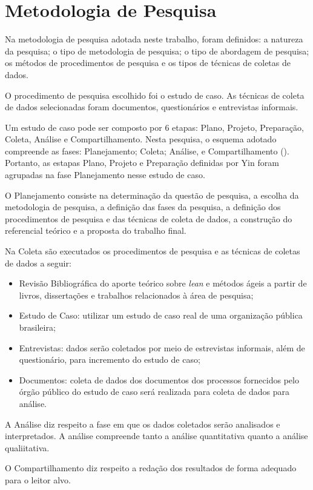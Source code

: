 \section[Metodologia de Pesquisa]{Metodologia de Pesquisa}

Na metodologia de pesquisa adotada neste trabalho, foram definidos: a natureza da pesquisa; o tipo de metodologia de pesquisa; o tipo de abordagem de pesquisa; os métodos de
procedimentos de pesquisa e os tipos de técnicas de coletas de dados.

O procedimento de pesquisa escolhido foi o estudo de caso. As técnicas de coleta de dados selecionadas foram
documentos, questionários e entrevistas informais. 

Um estudo de caso pode ser composto por 6 etapas: Plano, Projeto, Preparação, Coleta, Análise e Compartilhamento. Nesta pesquisa, o esquema adotado compreende as fases: Planejamento; Coleta; Análise, e Compartilhamento (\cite{yin}). Portanto, as estapas Plano, Projeto e Preparação definidas por Yin foram agrupadas na fase Planejamento nesse estudo de caso.

O Planejamento consiste na determinação da questão de pesquisa, a escolha da metodologia de pesquisa, a definição das fases da pesquisa,  a definição dos procedimentos de pesquisa e das técnicas de coleta de dados, a construção do referencial teórico e a proposta do trabalho final.


Na Coleta são executados os procedimentos de pesquisa e as técnicas de coletas de dados a seguir:

\begin{itemize}
\item Revisão Bibliográfica do aporte teórico sobre \textit{lean} e métodos ágeis a partir de livros, dissertações e trabalhos relacionados à área de pesquisa;
\item Estudo de Caso: utilizar um estudo de caso real de uma organização pública brasileira;
\item Entrevistas: dados serão coletados por meio de estrevistas informais, além de questionário, para incremento do estudo de caso;
\item Documentos: coleta de dados dos documentos dos processos fornecidos pelo órgão público do estudo de caso será realizada para coleta de dados para análise.
\end{itemize}

A Análise diz respeito a fase em que os dados coletados serão analisados e interpretados. A análise compreende tanto a análise quantitativa quanto a análise qualiitativa.

O Compartilhamento diz respeito a redação dos resultados de forma adequado para o leitor alvo.